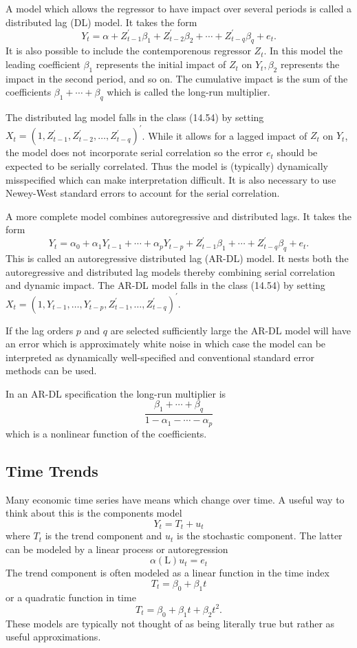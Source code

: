 \documentclass[10pt]{article}
\begin{document}
A model which allows the regressor to have impact over several periods is called a distributed lag (DL) model. It takes the form
$$
Y_{t}=\alpha+Z_{t-1}^{\prime} \beta_{1}+Z_{t-2}^{\prime} \beta_{2}+\cdots+Z_{t-q}^{\prime} \beta_{q}+e_{t} .
$$
It is also possible to include the contemporenous regressor $Z_{t}$. In this model the leading coefficient $\beta_{1}$ represents the initial impact of $Z_{t}$ on $Y_{t}, \beta_{2}$ represents the impact in the second period, and so on. The cumulative impact is the sum of the coefficients $\beta_{1}+\cdots+\beta_{q}$ which is called the long-run multiplier.

The distributed lag model falls in the class (14.54) by setting $X_{t}=\left(1, Z_{t-1}^{\prime}, Z_{t-2}^{\prime}, \ldots, Z_{t-q}^{\prime}\right)^{\prime}$. While it allows for a lagged impact of $Z_{t}$ on $Y_{t}$, the model does not incorporate serial correlation so the error $e_{t}$ should be expected to be serially correlated. Thus the model is (typically) dynamically misspecified which can make interpretation difficult. It is also necessary to use Newey-West standard errors to account for the serial correlation.

A more complete model combines autoregressive and distributed lags. It takes the form
$$
Y_{t}=\alpha_{0}+\alpha_{1} Y_{t-1}+\cdots+\alpha_{p} Y_{t-p}+Z_{t-1}^{\prime} \beta_{1}+\cdots+Z_{t-q}^{\prime} \beta_{q}+e_{t} .
$$
This is called an autoregressive distributed lag (AR-DL) model. It nests both the autoregressive and distributed lag models thereby combining serial correlation and dynamic impact. The AR-DL model falls in the class (14.54) by setting $X_{t}=\left(1, Y_{t-1}, \ldots, Y_{t-p}, Z_{t-1}^{\prime}, \ldots, Z_{t-q}^{\prime}\right)^{\prime}$.

If the lag orders $p$ and $q$ are selected sufficiently large the AR-DL model will have an error which is approximately white noise in which case the model can be interpreted as dynamically well-specified and conventional standard error methods can be used.

In an AR-DL specification the long-run multiplier is
$$
\frac{\beta_{1}+\cdots+\beta_{q}}{1-\alpha_{1}-\cdots-\alpha_{p}}
$$
which is a nonlinear function of the coefficients.

\subsection{Time Trends}
Many economic time series have means which change over time. A useful way to think about this is the components model
$$
Y_{t}=T_{t}+u_{t}
$$
where $T_{t}$ is the trend component and $u_{t}$ is the stochastic component. The latter can be modeled by a linear process or autoregression
$$
\alpha(\mathrm{L}) u_{t}=e_{t}
$$
The trend component is often modeled as a linear function in the time index
$$
T_{t}=\beta_{0}+\beta_{1} t
$$
or a quadratic function in time
$$
T_{t}=\beta_{0}+\beta_{1} t+\beta_{2} t^{2} .
$$
These models are typically not thought of as being literally true but rather as useful approximations.
\end{document}

